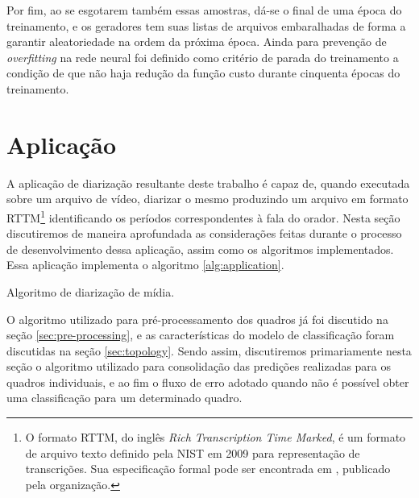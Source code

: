 Por fim, ao se esgotarem também essas amostras, dá-se o final de uma época do treinamento, e os geradores tem suas listas de arquivos embaralhadas de forma a garantir aleatoriedade na ordem da próxima época.
Ainda para prevenção de \textit{overfitting} na rede neural foi definido como critério de parada do treinamento a condição de que não haja redução da função custo durante cinquenta épocas do treinamento.

\section{Aplicação}
\label{sec:application}

A aplicação de diarização resultante deste trabalho é capaz de, quando executada sobre um arquivo de vídeo, diarizar o mesmo produzindo um arquivo em formato RTTM\footnote{O formato RTTM, do inglês \textit{Rich Transcription Time Marked}, é um formato de arquivo texto definido pela NIST em 2009 para representação de transcrições. Sua especificação formal pode ser encontrada em \cite{nist2009RT09Rich2009}, publicado pela organização.} identificando os períodos correspondentes à fala do orador. 
Nesta seção discutiremos de maneira aprofundada as considerações feitas durante o processo de desenvolvimento dessa aplicação, assim como os algoritmos implementados. Essa aplicação implementa o algoritmo \ref{alg:application}.

\begin{algorithm}[ht]
    \SetAlgoLined
    \caption{Algoritmo de diarização de mídia.}
    \label{alg:application}
\end{algorithm}

O algoritmo utilizado para pré-processamento dos quadros já foi discutido na seção \ref{sec:pre-processing}, e as características do modelo de classificação foram discutidas na seção \ref{sec:topology}.
Sendo assim, discutiremos primariamente nesta seção o algoritmo utilizado para consolidação das predições realizadas para os quadros individuais, e ao fim o fluxo de erro adotado quando não é possível obter uma classificação para um determinado quadro.

